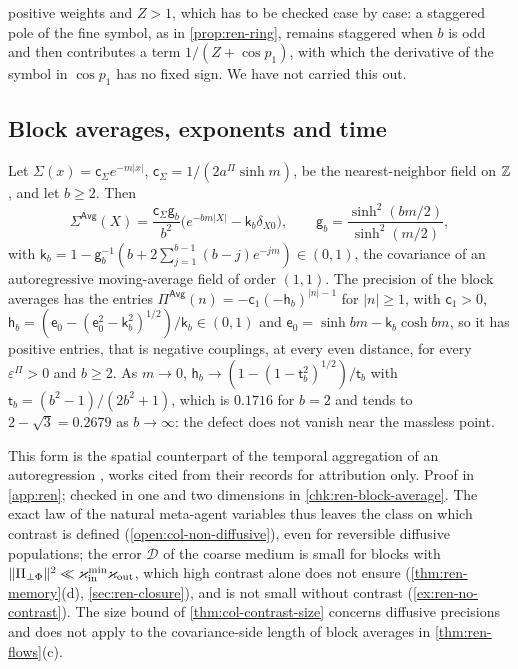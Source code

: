 positive weights and $Z>1$, which has to be checked case by case: a staggered pole of the fine symbol, as in \cref{prop:ren-ring}, remains staggered when $b$ is odd and then contributes a term $1/(Z+\cos p_1)$, with which the derivative of the symbol in $\cos p_1$ has no fixed sign. We have not carried this out.

\subsection{Block averages, exponents and time}\label{sup:ren-block-averages-exponents-and-time}

\begin{example}\label{ex:ren-block-average}
Let $\Sigma(x)=\mathsf c_\Sigma e^{-m\lvert x\rvert}$, $\mathsf c_\Sigma=1/(2a^\Pi\sinh m)$, be the nearest-neighbor field on $\mathbb{Z}$, and let $b\ge2$. Then
\[
\Sigma^{\mathsf{Avg}}(X)=\frac{\mathsf c_\Sigma\mathsf g_b}{b^2}\bigl(e^{-bm\lvert X\rvert}-\mathsf k_b\delta_{X0}\bigr),\qquad\mathsf g_b=\frac{\sinh^2(bm/2)}{\sinh^2(m/2)},
\]
with $\mathsf k_b=1-\mathsf g_b^{-1}(b+2\sum_{j=1}^{b-1}(b-j)e^{-jm})\in(0,1)$, the covariance of an autoregressive moving-average field of order $(1,1)$. The precision of the block averages has the entries $\Pi^{\mathsf{Avg}}(n)=-\mathsf c_1(-\mathsf h_b)^{\lvert n\rvert-1}$ for $\lvert n\rvert\ge1$, with $\mathsf c_1>0$, $\mathsf h_b=(\mathsf e_0-(\mathsf e_0^2-\mathsf k_b^2)^{1/2})/\mathsf k_b\in(0,1)$ and $\mathsf e_0=\sinh bm-\mathsf k_b\cosh bm$, so it has positive entries, that is negative couplings, at every even distance, for every $\varepsilon^\Pi>0$ and $b\ge2$. As $m\to0$, $\mathsf h_b\to(1-(1-\mathsf t_b^2)^{1/2})/\mathsf t_b$ with $\mathsf t_b=(b^2-1)/(2b^2+1)$, which is $0.1716$ for $b=2$ and tends to $2-\sqrt3=0.2679$ as $b\to\infty$: the defect does not vanish near the massless point.
\end{example}
This form is the spatial counterpart of the temporal aggregation of an autoregression \citep{amemiya1972effect,working1960note}, works cited from their records for attribution only. Proof in \cref{app:ren}; checked in one and two dimensions in \cref{chk:ren-block-average}. The exact law of the natural meta-agent variables thus leaves the class on which contrast is defined (\cref{open:col-non-diffusive}), even for reversible diffusive populations; the error $\mathcal D$ of the coarse medium is small for blocks with $\Vert\Pi_{\perp\Phi}\Vert^2\ll\varkappa_{\mathrm{in}}^{\min}\varkappa_{\mathrm{out}}$, which high contrast alone does not ensure (\cref{thm:ren-memory}(d), \cref{sec:ren-closure}), and is not small without contrast (\cref{ex:ren-no-contrast}). The size bound of \cref{thm:col-contrast-size} concerns diffusive precisions and does not apply to the covariance-side length of block averages in \cref{thm:ren-flows}(c).

